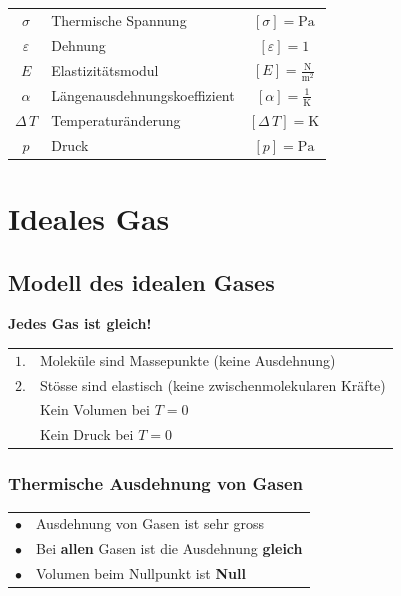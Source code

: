 \begin{tabular}{c l c}
		$\sigma$ & Thermische Spannung & $[\sigma] = \mathrm{Pa}$ \\
		$\varepsilon$ & Dehnung & $[\varepsilon] = 1$ \\
		\rule{0pt}{8pt}$E$ & Elastizitätsmodul & $[E] = \mathrm{\frac{N}{m^2}}$ \\
		\rule{0pt}{8pt}$\alpha$ & Längenausdehnungskoeffizient & $[\alpha] = \mathrm{\frac{1}{K}}$ \\ 
		$\Delta \, T $ & Temperaturänderung & $[\Delta \, T ] = \mathrm{K}$ \\
		$p$ & Druck & $[p] = \mathrm{Pa} $ \\
\end{tabular}






\section{Ideales Gas}

\subsection{Modell des idealen Gases}
\textbf{Jedes Gas ist gleich!} \\


\begin{tabular}{ll}
$1.$ & Moleküle sind Massepunkte (keine Ausdehnung) \\
$2.$ & Stösse sind elastisch (keine zwischenmolekularen Kräfte) \\
& Kein Volumen bei $T = 0$ \\
& Kein Druck bei $T = 0$ \\
\end{tabular}





\subsubsection{Thermische Ausdehnung von Gasen}
\begin{tabular}{ll}
$\bullet$ & Ausdehnung von Gasen ist sehr gross \\
$\bullet$ & Bei \textbf{allen} Gasen ist die Ausdehnung \textbf{gleich} \\
$\bullet$ & Volumen beim Nullpunkt ist \textbf{Null} \\
\end{tabular}


